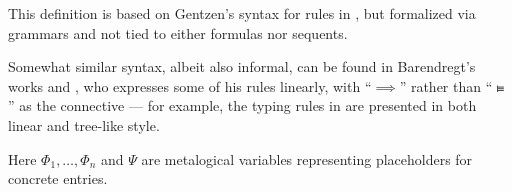 \begin{comments}
  \item This definition is based on Gentzen's syntax for rules in \cite[181]{Gentzen1935LogischeSchließen}, but formalized via grammars and not tied to either formulas nor sequents.

  \item Somewhat similar syntax, albeit also informal, can be found in Barendregt's works \cite{Barendregt1984LambdaCalculus} and \cite{Barendregt1992LambdaCalculiWithTypes}, who expresses some of his rules linearly, with \enquote{\( {\implies} \)} rather than \enquote{\( \vDdash \)} as the connective --- for example, the typing rules in \cite[def. 3.1.3]{Barendregt1992LambdaCalculiWithTypes} are presented in both linear and tree-like style.

  \item Here \( \Phi_1, \ldots, \Phi_n \) and \( \Psi \) are metalogical variables representing placeholders for concrete entries.
\end{comments}

